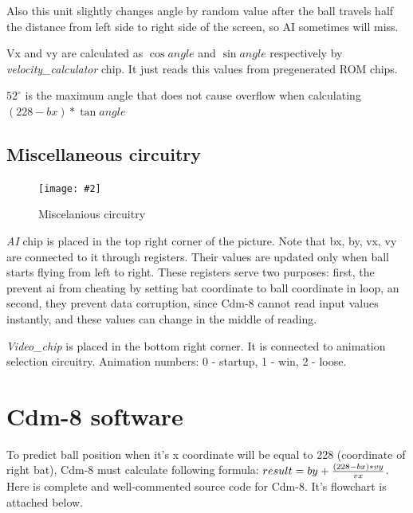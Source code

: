 \documentclass[12pt,a4paper]{article}
\let\oldsection\section
\renewcommand\section{\clearpage\oldsection}
\newcommand{\dofigure}[3][H]{
    \begin{figure}[#1]
        \centering
        \texttt{[image: \#2]}
        \caption{#3}
    \end{figure}
}
\newcommand{\chip}[1]{{\itshape#1}}
\begin{document}
    Also this unit slightly changes angle by random value after the ball travels half the distance from left side to right side of the screen, so AI sometimes will miss.

    Vx and vy are calculated as $\cos{angle}$ and $\sin{angle}$ respectively by \chip{velocity\_calculator} chip. It just reads this values from pregenerated ROM chips.

    $52^{\circ}$ is the maximum angle that does not cause overflow when calculating $(228-bx)*\tan{angle}$
    




    
    \subsection{Miscellaneous circuitry}
    \dofigure{misc}{Miscelanious circuitry}
    \chip{AI} chip is placed in the top right corner of the picture. Note that bx, by, vx, vy are connected to it through registers. Their values are updated only when ball starts flying from left  to right. These registers serve two purposes: first, the prevent ai from cheating by setting bat coordinate to ball coordinate in loop, an second, they prevent data corruption, since Cdm-8 cannot read input values instantly, and these values can change in the middle of reading.

    \chip{Video\_chip} is placed in the bottom right corner. It is connected to animation selection circuitry. Animation numbers: 0 - startup, 1 - win, 2 - loose.


    \section{Cdm-8 software}
    To predict ball position when it's x coordinate will be equal to 228 (coordinate of right bat), Cdm-8 must calculate following formula: {\Large $result=by + {(228-bx)*vy \over vx}$}. Here is complete and well-commented source code for Cdm-8. It's flowchart is attached below.
\end{document}
